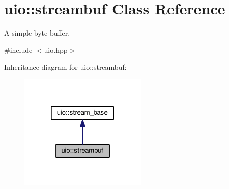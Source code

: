 \hypertarget{classuio_1_1streambuf}{}\section{uio\+:\+:streambuf Class Reference}
\label{classuio_1_1streambuf}


A simple byte-\/buffer.  




{\ttfamily \#include $<$uio.\+hpp$>$}



Inheritance diagram for uio\+:\+:streambuf\+:\nopagebreak
\begin{figure}[H]
\begin{center}
\leavevmode
\includegraphics[width=172pt]{classuio_1_1streambuf__inherit__graph}
\end{center}
\end{figure}
